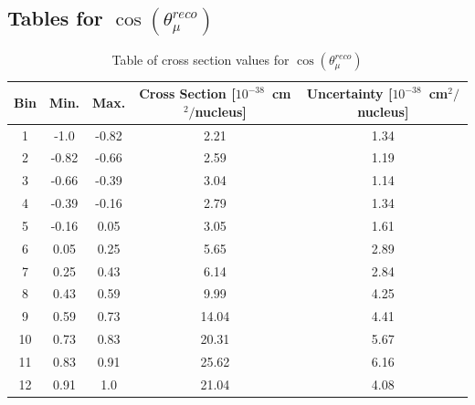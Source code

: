 \FloatBarrier\subsection{Tables for $\cos(\theta_{\mu}^{reco})$} 
\begin{table}[ht] 
\begin{tabular}{|c|c|c|c|c|} \hline 
Bin & Min. & Max. & Cross Section [$10^{-38}$~cm$^{2}/$nucleus] & Uncertainty [$10^{-38}$~cm$^{2}/$nucleus] \\ \hline 
1 & -1.0 & -0.82 & 2.21 & 1.34 \\ \hline 
2 & -0.82 & -0.66 & 2.59 & 1.19 \\ \hline 
3 & -0.66 & -0.39 & 3.04 & 1.14 \\ \hline 
4 & -0.39 & -0.16 & 2.79 & 1.34 \\ \hline 
5 & -0.16 & 0.05 & 3.05 & 1.61 \\ \hline 
6 & 0.05 & 0.25 & 5.65 & 2.89 \\ \hline 
7 & 0.25 & 0.43 & 6.14 & 2.84 \\ \hline 
8 & 0.43 & 0.59 & 9.99 & 4.25 \\ \hline 
9 & 0.59 & 0.73 & 14.04 & 4.41 \\ \hline 
10 & 0.73 & 0.83 & 20.31 & 5.67 \\ \hline 
11 & 0.83 & 0.91 & 25.62 & 6.16 \\ \hline 
12 & 0.91 & 1.0 & 21.04 & 4.08 \\ \hline 
\end{tabular} 
\caption{Table of cross section values for $\cos(\theta_{\mu}^{reco})$} 
\end{table} 
 
